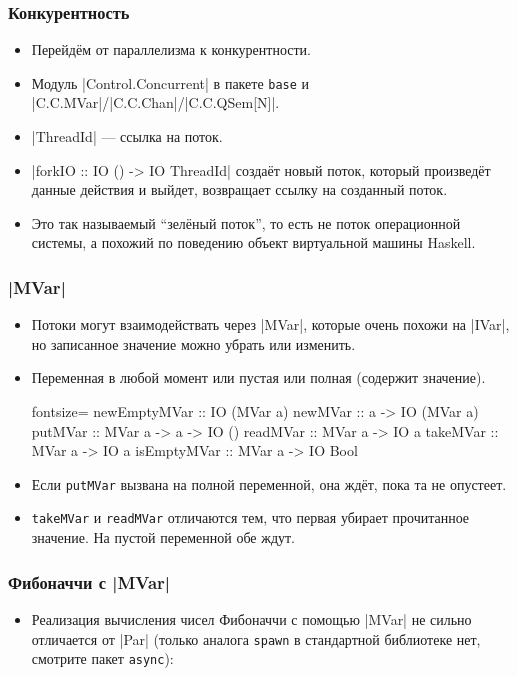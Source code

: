\documentclass[11pt]{beamer}
\begin{document}
\begin{frame}[fragile]
\frametitle{Конкурентность}
\begin{itemize}
    \item Перейдём от параллелизма к конкурентности. 
    \item Модуль \haskinline|Control.Concurrent| в пакете \lstinline|base| и \haskinline|C.C.MVar|/\haskinline|C.C.Chan|/\haskinline|C.C.QSem[N]|.
    \item \haskinline|ThreadId| --- ссылка на поток.
    \item \haskinline|forkIO :: IO () -> IO ThreadId| создаёт новый поток, который произведёт данные действия и выйдет, возвращает ссылку на созданный поток.
    \pause
    \item Это так называемый \enquote{зелёный поток}, то есть не поток операционной системы, а похожий по поведению объект виртуальной машины Haskell.
\end{itemize}
\end{frame}

\begin{frame}[fragile]
\frametitle{\haskinline|MVar|}
\begin{itemize}
    \item Потоки могут взаимодействать через \haskinline|MVar|, которые очень похожи на \haskinline|IVar|, но записанное значение можно убрать или изменить.
    \item Переменная в любой момент или пустая или полная (содержит значение).
\begin{haskell*}{fontsize=\footnotesize}
newEmptyMVar :: IO (MVar a)
newMVar :: a -> IO (MVar a)
putMVar :: MVar a -> a -> IO ()
readMVar :: MVar a -> IO a
takeMVar :: MVar a -> IO a
isEmptyMVar :: MVar a -> IO Bool
\end{haskell*}
    \item Если \lstinline|putMVar| вызвана на полной переменной, она ждёт, пока та не опустеет.
    \item \lstinline|takeMVar| и \lstinline|readMVar| отличаются тем, что первая убирает прочитанное значение. На пустой переменной обе ждут.
\end{itemize}
\end{frame}

\begin{frame}[fragile]
\frametitle{Фибоначчи с \haskinline|MVar|}
\begin{itemize}
    \item Реализация вычисления чисел Фибоначчи с помощью \haskinline|MVar| не сильно отличается от \haskinline|Par| (только аналога \lstinline|spawn| в стандартной библиотеке нет, смотрите пакет \lstinline|async|):
\end{itemize}
\end{frame}
\end{document}
